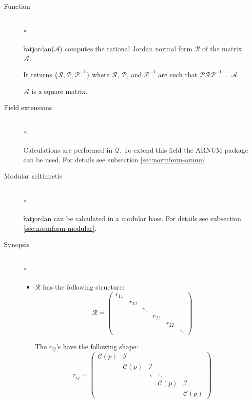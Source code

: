 \begin{description}
\item[Function]\mbox{}\\*

\f{ratjordan}($\mathcal{A}$) computes the rational Jordan normal form 
$\mathcal{R}$ of the matrix $\mathcal{A}$.

It returns $\{\mathcal{R}, \mathcal{P}, \mathcal{P}^{-1}\}$ where $\mathcal{R}$, 
$\mathcal{P}$, and $\mathcal{P}^{-1}$ are such that $\mathcal{P R P}^{-1} = 
\mathcal{A}$.

$\mathcal{A}$ is a square matrix.

\item[Field extensions]\mbox{}\\*

Calculations are performed in $\mathcal{Q}$. To extend this field the 
{\small ARNUM} package can be used. For details see subsection \ref{sec:normform-arnum}.

\item[Modular arithmetic]\mbox{}\\*

\f{ratjordan} can be calculated in a modular base. For details see 
subsection \ref{sec:normform-modular}.

\item[Synopsis]\mbox{}\\*

\begin{itemize}
\item $\mathcal{R}$ has the following structure:
      \begin{displaymath}
      \mathcal{R} = \begin{pmatrix} r_{11} \\  & 
      r_{12} \\  &  & \ddots \\  &  &  & r_{21}  \\ &  &  
      &  &  r_{22} \\ &  &  &  &  & \ddots \end{pmatrix} 
      \end{displaymath}

      The $r_{ij}$'s have the following shape:  
      \begin{displaymath}
      r_{ij} = \begin{pmatrix} \mathcal{C}(p) & 
      \mathcal{I}  &  &  & \\  &  \mathcal{C}(p) & \mathcal{I}  & & \\ & 
      & \ddots & \ddots & \\ &  &  &  \mathcal{C}(p) & \mathcal{I} \\ &
      &  &  & \mathcal{C}(p) \end{pmatrix} 
      \end{displaymath}


\end{itemize}
\end{description}
